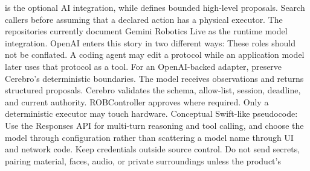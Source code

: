 {}\markdownRendererThematicBreak{}\markdownRendererInterblockSeparator
{}
\markdownRendererSectionEnd \markdownRendererSectionBegin
{}\markdownRendererInterblockSeparator
{}\markdownRendererBlockQuoteBegin
{}  is the optional AI integration, while  defines bounded high-level proposals. Search callers before assuming that a declared action has a physical executor.\markdownRendererBlockQuoteEnd \markdownRendererInterblockSeparator
{}The repositories currently document Gemini Robotics Live as the runtime model\markdownRendererSoftLineBreak
{}integration. OpenAI enters this story in two different ways:\markdownRendererInterblockSeparator
{}\markdownRendererOlBegin
{}\markdownRendererOlItemEnd 
{}\markdownRendererOlItemEnd 
\markdownRendererOlEnd \markdownRendererInterblockSeparator
{}These roles should not be conflated. A coding agent may edit a protocol while\markdownRendererSoftLineBreak
{}an application model later uses that protocol as a tool.\markdownRendererParagraphSeparator
{}For an OpenAI-backed adapter, preserve Cerebro's deterministic boundaries. The\markdownRendererSoftLineBreak
{}model receives observations and returns structured proposals. Cerebro validates\markdownRendererSoftLineBreak
{}the schema, allow-list, session, deadline, and current authority. ROBController\markdownRendererSoftLineBreak
{}approves where required. Only a deterministic executor may touch hardware.\markdownRendererParagraphSeparator
{}Conceptual Swift-like pseudocode:\markdownRendererInterblockSeparator
{}\markdownRendererInterblockSeparator
{}Use the Responses API for multi-turn reasoning and tool calling, and choose the\markdownRendererSoftLineBreak
{}model through configuration rather than scattering a model name through UI and\markdownRendererSoftLineBreak
{}network code. Keep credentials outside source control. Do not send secrets,\markdownRendererSoftLineBreak
{}pairing material, faces, audio, or private surroundings unless the product's\markdownRendererSoftLineBreak
